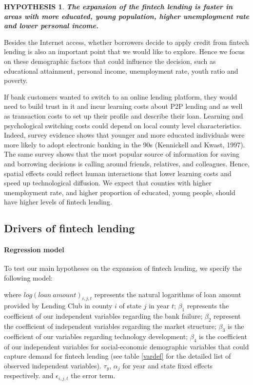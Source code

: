 \documentclass[11pt, a4paper, leqno]{article}
\newtheorem{hypothesis}{HYPOTHESIS}
\begin{document}
\begin{hypothesis}
\textbf{The expansion of the fintech lending is faster in areas with more educated, young population, higher unemployment rate and lower personal income.}
\end{hypothesis}
Besides the Internet access, whether borrowers decide to apply credit from fintech lending is also an important point that we would like to explore. Hence we focus on these demographic factors that could influence the decision, such as educational attainment, personal income, unemployment rate, youth ratio and poverty.

If bank customers wanted to switch to an online lending platform, they would need to build trust in it and incur learning costs about P2P lending and as well as transaction costs to set up their profile and describe their loan. Learning and psychological switching costs could depend on local county level characteristics. Indeed, survey evidence shows that younger and more educated individuals were more likely to adopt electronic banking in the 90s (Kennickell and Kwast, 1997). The same survey shows that the most popular source of information for saving and borrowing decisions is calling around friends, relatives, and colleagues. Hence, spatial effects could reflect human interactions that lower learning costs and speed up technological diffusion. We expect that counties with higher unemployment rate, and higher proportion of educated, young people, should have higher levels of fintech lending.

\subsection{Drivers of fintech lending}

\paragraph{Regression model} 
To test our main hypotheses on the expansion of fintech lending, we specify the following model:

where $log(loan\ amount)_{i,j,t}$ represents the natural logarithms of loan amount provided by Lending Club in county $i$ of state $j$ in year $t$; $\beta_1$ represents the coefficient of our independent variables regarding the bank failure; $\beta_2$ represent the coefficient of independent variables regarding the market structure; $\beta_3$ is the coefficient of our variables regarding technology development; $\beta_4$ is the coefficient of our independent variables for social-economic demographic variables that could capture demand for fintech lending (see table \ref{vardef} for the detailed list of observed independent variables). $\tau_{y}$, $\alpha_{j}$ for year and state fixed effects respectively. and $\epsilon_{i,j,t}$ the error term. 
\end{document}
